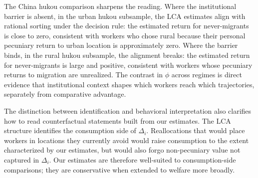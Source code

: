 The China hukou comparison sharpens the reading.
Where the institutional barrier is absent, in the urban hukou subsample, the LCA estimates align with rational sorting under the decision rule: the estimated return for never-migrants is close to zero, consistent with workers who chose rural because their personal pecuniary return to urban location is approximately zero.
Where the barrier binds, in the rural hukou subsample, the alignment breaks: the estimated return for never-migrants is large and positive, consistent with workers whose pecuniary returns to migration are unrealized.
The contrast in $\phi$ across regimes is direct evidence that institutional context shapes which workers reach which trajectories, separately from comparative advantage.

The distinction between identification and behavioral interpretation also clarifies how to read counterfactual statements built from our estimates.
The LCA structure identifies the consumption side of $\Delta_i$.
Reallocations that would place workers in locations they currently avoid would raise consumption to the extent characterized by our estimates, but would also forgo non-pecuniary value not captured in $\Delta_i$.
Our estimates are therefore well-suited to consumption-side comparisons; they are conservative when extended to welfare more broadly.
